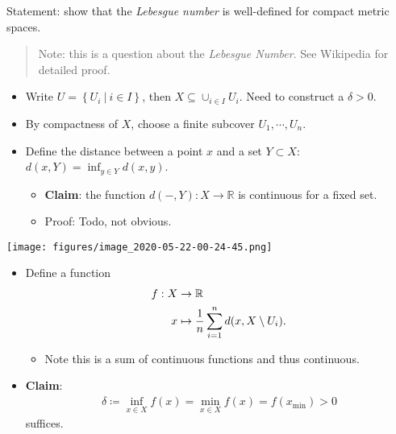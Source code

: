 \begin{solution}

\envlist

Statement: show that the \emph{Lebesgue number} is well-defined for
compact metric spaces.

\begin{quote}
Note: this is a question about the \emph{Lebesgue Number}. See Wikipedia
for detailed proof.
\end{quote}

\begin{itemize}
\tightlist
\item
  Write \(U = \left\{{U_i {~\mathrel{\Big|}~}i\in I}\right\}\), then
  \(X \subseteq \cup_{i\in I} U_i\). Need to construct a \(\delta > 0\).
\item
  By compactness of \(X\), choose a finite subcover
  \(U_1, \cdots, U_n\).
\item
  Define the distance between a point \(x\) and a set \(Y\subset X\):
  \(d(x, Y) = \inf_{y\in Y} d(x, y)\).

  \begin{itemize}
  \tightlist
  \item
    \textbf{Claim}: the function \(d({-}, Y): X\to {\mathbb{R}}\) is
    continuous for a fixed set.
  \item
    Proof: Todo, not obvious.
  \end{itemize}
\end{itemize}

\texttt{[image: figures/image\_2020-05-22-00-24-45.png]}

\begin{itemize}
\tightlist
\item
  Define a function
  \begin{align*}     f: X &\to {\mathbb{R}}\\     x &\mapsto {1\over n} \sum_{i=1}^n d(x, X\setminus U_i)      .\end{align*}

  \begin{itemize}
  \tightlist
  \item
    Note this is a sum of continuous functions and thus continuous.
  \end{itemize}
\item
  \textbf{Claim}:
  \begin{align*}\delta \coloneqq\inf_{x\in X}f(x) = \min_{x\in X}f(x) = f(x_{\text{min}}) > 0\end{align*}
  suffices.


\end{itemize}
\end{solution}
